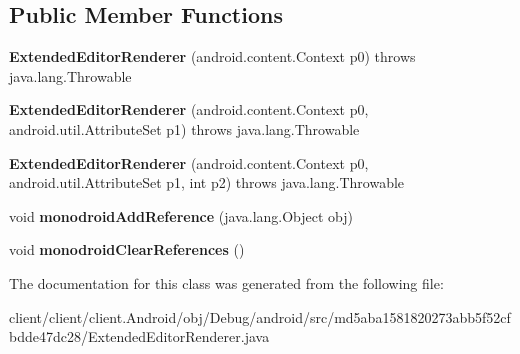 \subsection*{Public Member Functions}
\begin{DoxyCompactItemize}
\item 
\hypertarget{classmd5aba1581820273abb5f52cfbdde47dc28_1_1ExtendedEditorRenderer_a46aabd4b2a18ca149645405028f2760b}{}{\bfseries Extended\+Editor\+Renderer} (android.\+content.\+Context p0)  throws java.\+lang.\+Throwable 	\label{classmd5aba1581820273abb5f52cfbdde47dc28_1_1ExtendedEditorRenderer_a46aabd4b2a18ca149645405028f2760b}

\item 
\hypertarget{classmd5aba1581820273abb5f52cfbdde47dc28_1_1ExtendedEditorRenderer_a5763a918646a27dc18583d133667d905}{}{\bfseries Extended\+Editor\+Renderer} (android.\+content.\+Context p0, android.\+util.\+Attribute\+Set p1)  throws java.\+lang.\+Throwable 	\label{classmd5aba1581820273abb5f52cfbdde47dc28_1_1ExtendedEditorRenderer_a5763a918646a27dc18583d133667d905}

\item 
\hypertarget{classmd5aba1581820273abb5f52cfbdde47dc28_1_1ExtendedEditorRenderer_a2fc29f59ac619d44ee1c68bc6f2eda3f}{}{\bfseries Extended\+Editor\+Renderer} (android.\+content.\+Context p0, android.\+util.\+Attribute\+Set p1, int p2)  throws java.\+lang.\+Throwable 	\label{classmd5aba1581820273abb5f52cfbdde47dc28_1_1ExtendedEditorRenderer_a2fc29f59ac619d44ee1c68bc6f2eda3f}

\item 
\hypertarget{classmd5aba1581820273abb5f52cfbdde47dc28_1_1ExtendedEditorRenderer_a38c9a8e5939a3315466df1417d471062}{}void {\bfseries monodroid\+Add\+Reference} (java.\+lang.\+Object obj)\label{classmd5aba1581820273abb5f52cfbdde47dc28_1_1ExtendedEditorRenderer_a38c9a8e5939a3315466df1417d471062}

\item 
\hypertarget{classmd5aba1581820273abb5f52cfbdde47dc28_1_1ExtendedEditorRenderer_a1d62ac1d8c603380cdea159f3888a689}{}void {\bfseries monodroid\+Clear\+References} ()\label{classmd5aba1581820273abb5f52cfbdde47dc28_1_1ExtendedEditorRenderer_a1d62ac1d8c603380cdea159f3888a689}

\end{DoxyCompactItemize}


The documentation for this class was generated from the following file\+:\begin{DoxyCompactItemize}
\item 
client/client/client.\+Android/obj/\+Debug/android/src/md5aba1581820273abb5f52cfbdde47dc28/Extended\+Editor\+Renderer.\+java\end{DoxyCompactItemize}
